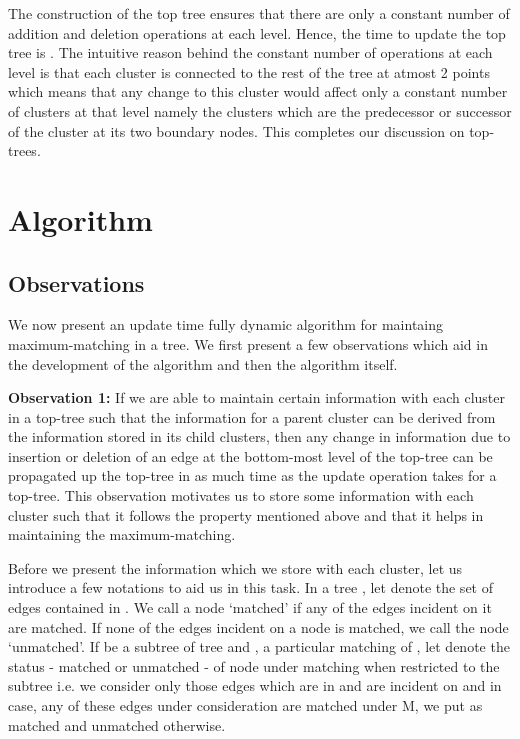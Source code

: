 \documentclass[a4paper,12pt]{article}
\begin{document}
The construction of the top tree ensures that there are only a constant number of addition and deletion operations at each level. Hence, the time to update the top tree is . The intuitive reason behind the constant number of operations at each level is that each cluster is connected to the rest of the tree at atmost 2 points which means that any change to this cluster would affect only a constant number of clusters at that level namely the clusters which are the predecessor or successor of the cluster at its two boundary nodes. This completes our discussion on top-trees.

\section{Algorithm}
\subsection{Observations\label{observations}}
We now present an  update time fully dynamic algorithm for maintaing maximum-matching in a tree. We first present a few observations which aid in the development of the algorithm and then the algorithm itself.

{\bf Observation 1:} If we are able to maintain certain information with each cluster in a top-tree such that the information for a parent cluster can be derived from the information stored in its child clusters, then any change in information due to insertion or deletion of an edge at the bottom-most level of the top-tree can be propagated up the top-tree in as much time as the update operation takes for a top-tree. This observation motivates us to store some information with each cluster such that it follows the property mentioned above and that it helps in maintaining the maximum-matching.

Before we present the information which we store with each cluster, let us introduce a few notations to aid us in this task. In a tree , let  denote the set of edges contained in . We call a node `matched' if any of the edges incident on it are matched. If none of the edges incident on a node is matched, we call the node `unmatched'. If  be a subtree of tree  and , a particular matching of , let  denote the status - matched or unmatched - of node  under matching  when restricted to the subtree  i.e. we consider only those edges which are in  and are incident on  and in case, any of these edges under consideration are matched under M, we put  as matched and unmatched otherwise.
\end{document}
